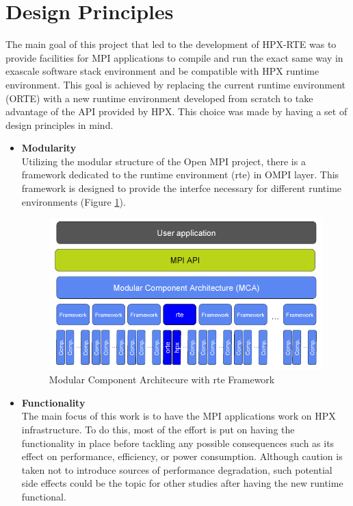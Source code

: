 \section{Design Principles}
\label{sec:design}
The main goal of this project that led to the development of HPX-RTE was to provide facilities for MPI applications to compile and run the exact same way in exascale software stack environment and be compatible with HPX runtime environment. This goal is achieved by replacing the current runtime environment (ORTE) with a new runtime environment developed from scratch to take advantage of the API provided by HPX. This choice was made by having a set of design principles in mind.

\begin{itemize}
\item \textbf{Modularity}\\
  Utilizing the modular structure of the Open MPI project, there is a framework dedicated to the runtime environment (rte) in OMPI layer. This framework is designed to provide the interfce necessary for different runtime environments (Figure \ref{fig:MCA-hpx-rte}).

\begin{figure}[ht]
\centering
\includegraphics[scale=0.5]{images/MCA-hpx-rte.png}
\caption[Modular Component Architecure with rte Framework]{Modular Component Architecure with rte Framework}
\label{fig:MCA-hpx-rte}
\end{figure}
  
\item \textbf{Functionality}\\
  The main focus of this work is to have the MPI applications work on HPX infrastructure. To do this, most of the effort is put on having the functionality in place before tackling any possible consequences such as its effect on performance, efficiency, or power consumption. Although caution is taken not to introduce sources of performance degradation, such potential side effects could be the topic for other studies after having the new runtime functional.
  

\end{itemize}
